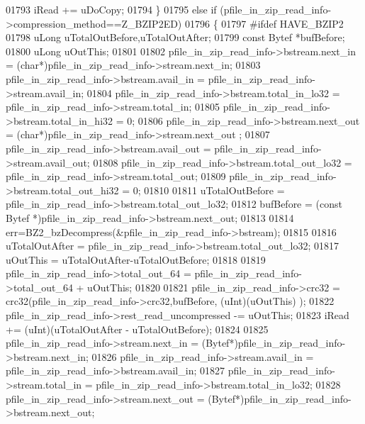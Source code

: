 \begin{DoxyCode}
01793             iRead += uDoCopy;
01794         \}
01795         \textcolor{keywordflow}{else} \textcolor{keywordflow}{if} (pfile\_in\_zip\_read\_info->compression\_method==Z\_BZIP2ED)
01796         \{
01797 \textcolor{preprocessor}{#ifdef HAVE\_BZIP2}
01798             uLong uTotalOutBefore,uTotalOutAfter;
01799             \textcolor{keyword}{const} Bytef *bufBefore;
01800             uLong uOutThis;
01801 
01802             pfile\_in\_zip\_read\_info->bstream.next\_in        = (\textcolor{keywordtype}{char}*)pfile\_in\_zip\_read\_info->stream.next\_in;
01803             pfile\_in\_zip\_read\_info->bstream.avail\_in       = pfile\_in\_zip\_read\_info->stream.avail\_in;
01804             pfile\_in\_zip\_read\_info->bstream.total\_in\_lo32  = pfile\_in\_zip\_read\_info->stream.total\_in;
01805             pfile\_in\_zip\_read\_info->bstream.total\_in\_hi32  = 0;
01806             pfile\_in\_zip\_read\_info->bstream.next\_out       = (\textcolor{keywordtype}{char}*)pfile\_in\_zip\_read\_info->stream.next\_out
      ;
01807             pfile\_in\_zip\_read\_info->bstream.avail\_out      = pfile\_in\_zip\_read\_info->stream.avail\_out;
01808             pfile\_in\_zip\_read\_info->bstream.total\_out\_lo32 = pfile\_in\_zip\_read\_info->stream.total\_out;
01809             pfile\_in\_zip\_read\_info->bstream.total\_out\_hi32 = 0;
01810 
01811             uTotalOutBefore = pfile\_in\_zip\_read\_info->bstream.total\_out\_lo32;
01812             bufBefore = (\textcolor{keyword}{const} Bytef *)pfile\_in\_zip\_read\_info->bstream.next\_out;
01813 
01814             err=BZ2\_bzDecompress(&pfile\_in\_zip\_read\_info->bstream);
01815 
01816             uTotalOutAfter = pfile\_in\_zip\_read\_info->bstream.total\_out\_lo32;
01817             uOutThis = uTotalOutAfter-uTotalOutBefore;
01818 
01819             pfile\_in\_zip\_read\_info->total\_out\_64 = pfile\_in\_zip\_read\_info->total\_out\_64 + uOutThis;
01820 
01821             pfile\_in\_zip\_read\_info->crc32 = crc32(pfile\_in\_zip\_read\_info->crc32,bufBefore, (uInt)(uOutThis)
      );
01822             pfile\_in\_zip\_read\_info->rest\_read\_uncompressed -= uOutThis;
01823             iRead += (uInt)(uTotalOutAfter - uTotalOutBefore);
01824 
01825             pfile\_in\_zip\_read\_info->stream.next\_in   = (Bytef*)pfile\_in\_zip\_read\_info->bstream.next\_in;
01826             pfile\_in\_zip\_read\_info->stream.avail\_in  = pfile\_in\_zip\_read\_info->bstream.avail\_in;
01827             pfile\_in\_zip\_read\_info->stream.total\_in  = pfile\_in\_zip\_read\_info->bstream.total\_in\_lo32;
01828             pfile\_in\_zip\_read\_info->stream.next\_out  = (Bytef*)pfile\_in\_zip\_read\_info->bstream.next\_out;

\end{DoxyCode}
